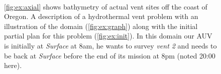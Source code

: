\begin{figure}[!htb]
  \centering
  \\
  \hfill {}
  \caption{\small{\ref{fig:ex:axial} shows bathymetry of actual vent
      sites off the coast of Oregon. A description of a hydrothermal
      vent problem with an illustration of the domain
      (\ref{fig:ex:graph}) along with the initial partial plan for
      this problem (\ref{fig:ex:init}). In this domain our AUV is
      initially at {\em Surface} at 8am, he wants to survey {\em vent
        2} and needs to be back at {\em
        Surface} before the end of its mission at 8pm (noted 20:00
      here).}}
\label{fig:Example}
\end{figure}

